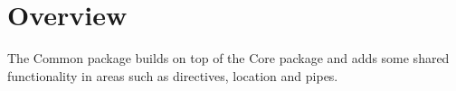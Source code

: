 \section{Overview}

The Common package builds on top of the Core package and adds some shared
functionality in areas such as directives, location and pipes.
